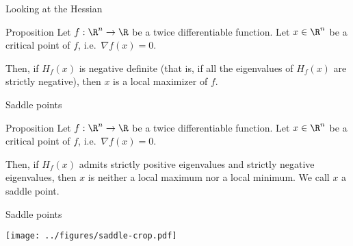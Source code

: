 \documentclass{beamer}
\begin{document}
\begin{frame}[t]{Looking at the Hessian}
	\grid

	\vspace{-0.2cm}
	\begin{block}{Proposition}
	Let $f:\R^n \to \R$ be a twice differentiable function. Let $x \in \R^n$ be a critical point of $f$, i.e.\ $\nabla f(x) = 0$. 

	Then, if $H_f(x)$ is negative definite (that is, if all the eigenvalues of $H_f(x)$ are strictly negative), then $x$ is a local maximizer of $f$.
	\end{block}

\end{frame}

\begin{frame}[t]{Saddle points}
	\grid

	\vspace{-0.2cm}
	\begin{block}{Proposition}
	Let $f:\R^n \to \R$ be a twice differentiable function. Let $x \in \R^n$ be a critical point of $f$, i.e.\ $\nabla f(x) = 0$. 

	Then, if $H_f(x)$ admits strictly positive eigenvalues and strictly negative eigenvalues, then $x$ is neither a local maximum nor a local minimum. We call $x$ a saddle point.
	\end{block}

\end{frame}

\begin{frame}[t]{Saddle points}
	\grid

	\begin{center}
		\texttt{[image: ../figures/saddle-crop.pdf]}
	\end{center}

\end{frame}
\end{document}
